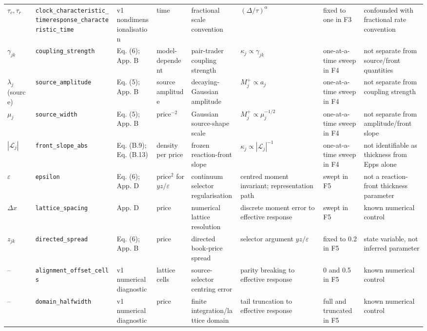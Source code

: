 \begin{table}[H]
\begin{tabularx}{\linewidth}{@{}p{1.7cm}p{3.3cm}p{2.3cm}p{2.5cm}X X X X@{}}
\(\tau_c,\tau_r\) & \texttt{clock\_\allowbreak{}characteristic\_\allowbreak{}time}\newline\texttt{response\_\allowbreak{}characteristic\_\allowbreak{}time} & v1 nondimensionalisation & time & fractional scale convention & \((\Delta/\tau)^\alpha\) & fixed to one in F3 & confounded with fractional rate convention \\
\(\gamma_{jk}\) & \texttt{coupling\_\allowbreak{}strength} & Eq. (6); App. B & model-dependent & pair-trader coupling strength & \(\kappa_j\propto\gamma_{jk}\) & one-at-a-time sweep in F4 & not separate from source/front quantities \\
\(\lambda_j\) (source) & \texttt{source\_\allowbreak{}amplitude} & Eq. (5); App. B & source amplitude & decaying-Gaussian amplitude & \(M_j^+\propto a_j\) & one-at-a-time sweep in F4 & not separate from coupling strength \\
\(\mu_j\) & \texttt{source\_\allowbreak{}width} & Eq. (5); App. B & price\(^{-2}\) & Gaussian source-shape scale & \(M_j^+\propto\mu_j^{-1/2}\) & one-at-a-time sweep in F4 & not separate from amplitude/front slope \\
\(|\mathcal L_j|\) & \texttt{front\_\allowbreak{}slope\_\allowbreak{}abs} & Eq. (B.9); Eq. (B.13) & density per price & frozen reaction-front slope & \(\kappa_j\propto|\mathcal L_j|^{-1}\) & one-at-a-time sweep in F4 & not identifiable as thickness from Epps alone \\
\(\varepsilon\) & \texttt{epsilon} & Eq. (6); App. D & price\(^2\) for \(yz/\varepsilon\) & continuum selector regularisation & centred moment invariant; representation path & swept in F5 & not a reaction-front thickness parameter \\
\(\Delta x\) & \texttt{lattice\_\allowbreak{}spacing} & App. D & price & numerical lattice resolution & discrete moment error to effective response & swept in F5 & known numerical control \\
\(z_{jk}\) & \texttt{directed\_\allowbreak{}spread} & Eq. (6); App. B & price & directed book-price spread & selector argument \(yz/\varepsilon\) & fixed to 0.2 in F5 & state variable, not inferred parameter \\
-- & \texttt{alignment\_\allowbreak{}offset\_\allowbreak{}cells} & v1 numerical diagnostic & lattice cells & source-selector centring error & parity breaking to effective response & 0 and 0.5 in F5 & known numerical control \\
-- & \texttt{domain\_\allowbreak{}halfwidth} & v1 numerical diagnostic & price & finite integration/lattice domain & tail truncation to effective response & full and truncated in F5 & known numerical control \\
\bottomrule
\end{tabularx}
\end{table}
